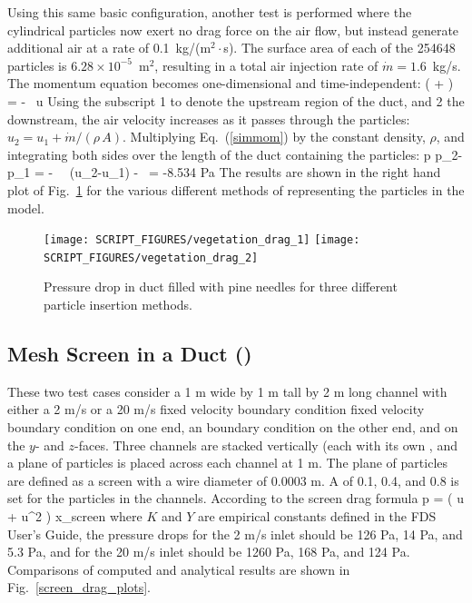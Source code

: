 \documentclass[11pt]{book}
\begin{document}
Using this same basic configuration, another test is performed where the cylindrical particles now exert no drag force on the air flow, but instead generate additional air at a rate of 0.1~kg/(m$^2 \cdot$s). The surface area of each of the 254648 particles is $6.28 \times 10^{-5}$~m$^2$, resulting in a total air injection rate of $\dot{m}=1.6$~kg/s. The momentum equation becomes one-dimensional and time-independent:
\be
    \left(  +  \right) = -   \, u  \label{simmom}
\ee
Using the subscript 1 to denote the upstream region of the duct, and 2 the downstream, the air velocity increases as it passes through the particles: $u_2=u_1+\dot{m}/(\rho \, A)$. Multiplying Eq.~(\ref{simmom}) by the constant density, $\rho$, and integrating both sides over the length of the duct containing the particles:
\be
   \Delta p \equiv p_2-p_1 =  - \rho \,  \, (u_2-u_1) -  \,  = -8.534  \; {\rm Pa}
\ee
The results are shown in the right hand plot of Fig.~\ref{vegetation_drag_fig} for the various different methods of representing the particles in the model.

\begin{figure}[ht]
\texttt{[image: SCRIPT\_FIGURES/vegetation\_drag\_1]}
\texttt{[image: SCRIPT\_FIGURES/vegetation\_drag\_2]}
\caption[The {\ct vegetation\_drag} test cases]{Pressure drop in duct filled with pine needles for three different particle insertion methods.}
\label{vegetation_drag_fig}
\end{figure}



\subsection{Mesh Screen in a Duct (\texorpdfstring{}{screen\_drag})}
\label{screen_drag_1}
\label{screen_drag_2}

These two test cases consider a 1 m wide by 1 m tall by 2 m long channel with either a 2 m/s or a 20 m/s fixed velocity boundary condition fixed velocity boundary condition on one end, an  boundary condition on the other end, and  on the $y$- and $z$-faces.  Three channels are stacked vertically (each with its own , and a plane of particles is placed across each channel at 1 m.  The plane of particles are defined as a screen with a wire diameter of 0.0003 m.  A  of 0.1, 0.4, and 0.8 is set for the particles in the channels.  According to the screen drag formula
\be
   \Delta p \;= \; \left(  u \; + \; \rho {} u^2 \right) \Delta x_{\rm screen}
\ee
where $K$ and $Y$ are empirical constants defined in the FDS User's Guide, the pressure drops for the 2 m/s inlet should be 126 Pa, 14 Pa, and 5.3 Pa, and for the 20 m/s inlet should be 1260 Pa, 168 Pa, and 124 Pa.   Comparisons of computed and analytical results are shown in Fig.~\ref{screen_drag_plots}.
\end{document}
